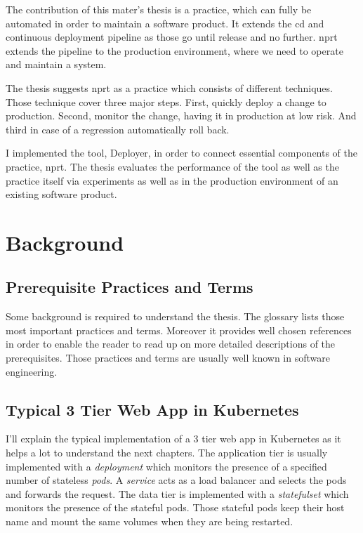 The contribution of this mater's thesis is a practice, which can fully be automated in order
to maintain a software product. It extends the \gls{cd} and continuous deployment pipeline
as those go until release and no further. \gls{nprt} extends the pipeline to the
production environment, where we need to operate and maintain a system.

The thesis suggests \gls{nprt} as a practice which consists of different techniques. Those
technique cover three major steps. First, quickly deploy a change to production. Second,
monitor the change, having it in production at low risk. And third in case of a regression
automatically roll back.

I implemented the tool, Deployer, in order to connect essential components of the
practice, \gls{nprt}. The thesis evaluates the performance of the tool as well as the
practice itself via experiments as well as in the production environment of an existing
software product.

\chapter{Background}
\label{chap:background}

\section{Prerequisite Practices and Terms}

Some background is required to understand the thesis. The glossary lists those most
important practices and terms. Moreover it provides well chosen references in order to
enable the reader to read up on more detailed descriptions of the prerequisites. Those
practices and terms are usually well known in software engineering.

\section{Typical 3 Tier Web App in Kubernetes}

I'll explain the typical implementation of a 3 tier web app in Kubernetes as it helps a lot
to understand the next chapters. The application tier is usually implemented with a
\emph{deployment} which monitors the presence of a specified number of stateless
\emph{pods}. A \emph{service} acts as a load balancer and selects the pods and forwards the
request. The data tier is implemented with a \emph{statefulset} which monitors the
presence of the stateful pods. Those stateful pods keep their host name and mount the same
volumes when they are being restarted.

